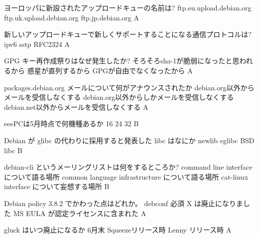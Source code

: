 %

\santaku
{ヨーロッパに新設されたアップロードキューの名前は?}
{ftp.eu.upload.debian.org}
{ftp.uk.upload.debian.org}
{ftp.jp.debian.org}
{A}
{}

\santaku
{新しいアップロードキューで新しくサポートすることになる通信プロトコルは?}
{ipv6}
{sstp}
{RFC2324} %
{A}
{}

\santaku
{GPG キー再作成祭りはなぜ発生したか?}
{そろそろsha-1が脆弱になったと思われるから}
{惑星が直列するから}
{GPGが自由でなくなったから}
{A}
{}

\santaku
{packages.debian.org メールについて何がアナウンスされたか}
{debian.org以外からメールを受信しなくする}
{debian.org以外からしかメールを受信しなくする}
{debian.net以外からメールを受信しなくする}
{A}
{}

\santaku
{eeePCは5月時点で何機種あるか}
{16}
{24}
{32}
{B}
{}

\santaku
{Debian が glibc の代わりに採用すると発表した libc はなにか}
{newlib}
{eglibc}
{BSD libc}
{B}
{}

\santaku
{debian-cli というメーリングリストは何をするところか?}
{command line interface について語る場所}
{common language infrastructure について語る場所}
{cat-linux interface について妄想する場所}
{B}
{}

\santaku
{Debian policy 3.8.2 でかわった点はどれか。}
{debconf 必須}
{X は廃止になりました}
{MS EULA が認定ライセンスに含まれた}
{A}
{}

\santaku
{gluck はいつ廃止になるか}
{6月末}
{Squeezeリリース時}
{Lenny リリース時}
{A}
{}
